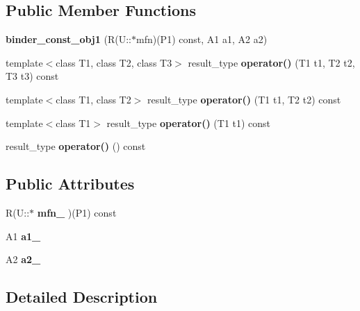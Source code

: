 \subsection*{Public Member Functions}
\begin{CompactItemize}
\item 
\textbf{binder\_\-const\_\-obj1} (R(U::$\ast$mfn)(P1) const, A1 a1, A2 a2)\label{structam_1_1lambda_1_1binder__const__obj1_47feeaff4557f1447b3cdf4321e711d6}

\item 
template$<$class T1, class T2, class T3$>$ result\_\-type \textbf{operator()} (T1 t1, T2 t2, T3 t3) const \label{structam_1_1lambda_1_1binder__const__obj1_bdf91b1530eef1ae77363f1f0bf6611d}

\item 
template$<$class T1, class T2$>$ result\_\-type \textbf{operator()} (T1 t1, T2 t2) const\label{structam_1_1lambda_1_1binder__const__obj1_f956f6211d0e4b671a8da274fec1856b}

\item 
template$<$class T1$>$ result\_\-type \textbf{operator()} (T1 t1) const \label{structam_1_1lambda_1_1binder__const__obj1_d0454dd843d61eb2bd07ead76866e9ab}

\item 
result\_\-type \textbf{operator()} () const\label{structam_1_1lambda_1_1binder__const__obj1_04ad7a0a0b5403a039a855ef06daac01}

\end{CompactItemize}
\subsection*{Public Attributes}
\begin{CompactItemize}
\item 
R(U::$\ast$ \textbf{mfn\_\-} )(P1) const\label{structam_1_1lambda_1_1binder__const__obj1_ac9115fc1d2339910f7af5d3614b03f9}

\item 
A1 \textbf{a1\_\-}\label{structam_1_1lambda_1_1binder__const__obj1_fff32d21d2458b5c998e4c5e8ddc608d}

\item 
A2 \textbf{a2\_\-}\label{structam_1_1lambda_1_1binder__const__obj1_715b4504a65b59d36f9d2663a0f6d270}

\end{CompactItemize}


\subsection{Detailed Description}

